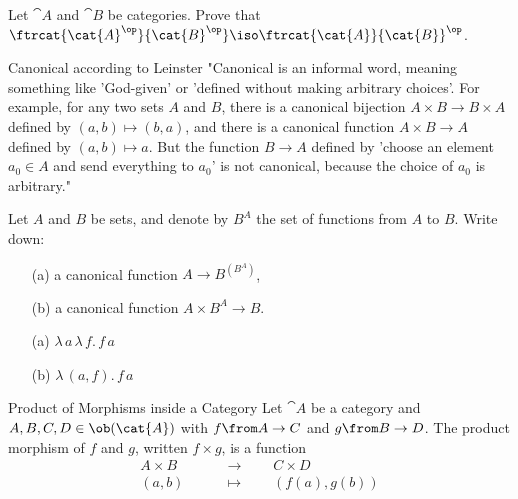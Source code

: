 \begin{exercise}
        Let $\cat{A}$ and $\cat{B}$ be categories.  Prove that
        $\ftrcat{\cat{A}^\op}{\cat{B}^\op} \iso \ftrcat{\cat{A}}{\cat{B}}^\op$.
\end{exercise}

\begin{definition}{Canonical according to Leinster}
  "Canonical is an informal word, meaning something like 'God-given' or
  'defined without making arbitrary choices'.  For example, for any two sets
  $A$ and $B$, there is a canonical bijection $A \times B \to B \times A$
  defined by $(a, b) \mapsto (b, a)$, and there is a canonical function $A
  \times B \to A$ defined by $(a, b) \mapsto a$.  But the function $B \to A$
  defined by 'choose an element $a_0 \in A$ and send everything to $a_0$' is
  not canonical, because the choice of $a_0$ is arbitrary."
\end{definition}

\begin{exercise}
  Let $A$ and $B$ be sets, and denote by $B^A$ the set of functions from $A$
  to $B$.  Write down:
  \begin{itemize}
  \item[(a)] a canonical function $A \to B^{(B^A)}$,
  \item[(b)] a canonical function $A \times B^{A} \to B$.
  \end{itemize}
\end{exercise}
\begin{answer}
    \begin{itemize}
        \item[(a)] $\lambda\, a\, \lambda\,f.\, f\,a$
        \item[(b)] $\lambda\, (a, f).\, f\,a$
    \end{itemize}
\end{answer}

\begin{definition}{Product of Morphisms inside a Category}
  Let $\cat{A}$ be a category and $A, B, C, D \in \ob(\cat{A})$ with $f \from A \to C$ and $g \from B \to D$.
  The product morphism of $f$ and $g$, written $f \times g$, is a function
  \begin{align*}
    A \times B &\qquad\to\qquad C \times D\\
    (a, b) &\qquad\mapsto\qquad (f(a), g(b))
  \end{align*}
\end{definition}

\newcommand{\eval}[1]{\ensuremath{\mathsf{eval}^{#1}\xspace}}

